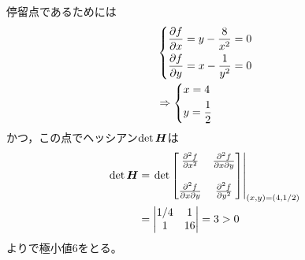 \begin{ans*}
  停留点であるためには
  \begin{align}
    &\begin{dcases*}
      \ppar{f}{x} = y - \frac{8}{x^2} = 0 \\
      \ppar{f}{y} = x - \frac{1}{y^2} = 0
    \end{dcases*}\\
    &\Rightarrow
    \begin{dcases*}
      x = 4 \\
      y = \frac{1}{2}
    \end{dcases*}
  \end{align}
  かつ，この点でヘッシアン$\det\bm{H}$は
  \begin{align}
    \det\bm{H}
    &=
    \left.
    \det 
    \begin{bmatrix}
    \frac{\partial^2f}{\partial x^2} & \frac{\partial^2f}{\partial x\partial y} \\
    \\
    \frac{\partial^2f}{\partial x\partial y} & \frac{\partial^2f}{\partial y^2}
    \end{bmatrix}\right|_{(x,y) = (4,1/2)} \\
    &=
    \begin{vmatrix}
      1/4 & 1 \\
      1 & 16
    \end{vmatrix}
    = 3 > 0
  \end{align}
  よりで極小値6をとる。
\end{ans*}

